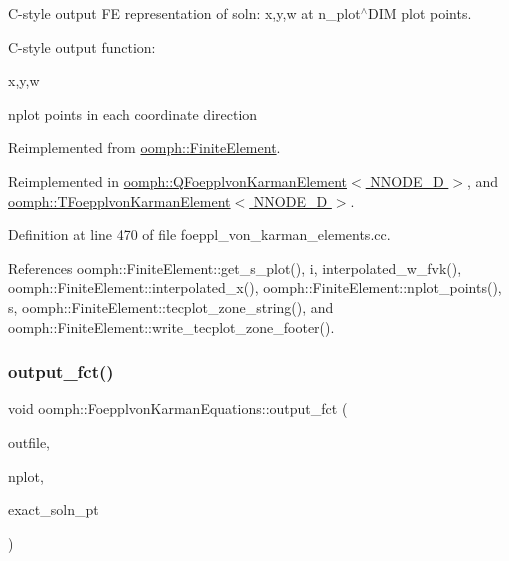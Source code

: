 C-\/style output FE representation of soln\+: x,y,w at n\+\_\+plot$^\wedge$\+D\+IM plot points. 

C-\/style output function\+:

x,y,w

nplot points in each coordinate direction 

Reimplemented from \hyperlink{classoomph_1_1FiniteElement_adfaee690bb0608f03320eeb9d110d48c}{oomph\+::\+Finite\+Element}.



Reimplemented in \hyperlink{classoomph_1_1QFoepplvonKarmanElement_a06a3e1ea84c4177bc32c819b5aa0f01e}{oomph\+::\+Q\+Foepplvon\+Karman\+Element$<$ N\+N\+O\+D\+E\+\_\+D $>$}, and \hyperlink{classoomph_1_1TFoepplvonKarmanElement_ac3899c4e4e2ae477e5e5afec72ae4730}{oomph\+::\+T\+Foepplvon\+Karman\+Element$<$ N\+N\+O\+D\+E\+\_\+D $>$}.



Definition at line 470 of file foeppl\+\_\+von\+\_\+karman\+\_\+elements.\+cc.



References oomph\+::\+Finite\+Element\+::get\+\_\+s\+\_\+plot(), i, interpolated\+\_\+w\+\_\+fvk(), oomph\+::\+Finite\+Element\+::interpolated\+\_\+x(), oomph\+::\+Finite\+Element\+::nplot\+\_\+points(), s, oomph\+::\+Finite\+Element\+::tecplot\+\_\+zone\+\_\+string(), and oomph\+::\+Finite\+Element\+::write\+\_\+tecplot\+\_\+zone\+\_\+footer().

\mbox{\label{classoomph_1_1FoepplvonKarmanEquations_a2e926381021b99050cebb69a07867ebc}} 
\subsubsection{\texorpdfstring{output\+\_\+fct()}{output\_fct()}\hspace{0.1cm}{\footnotesize\ttfamily [1/2]}}
{\footnotesize\ttfamily void oomph\+::\+Foepplvon\+Karman\+Equations\+::output\+\_\+fct (\begin{DoxyParamCaption}\item[{std\+::ostream \&}]{outfile,  }\item[{const unsigned \&}]{nplot,  }\item[{\hyperlink{classoomph_1_1FiniteElement_a690fd33af26cc3e84f39bba6d5a85202}{Finite\+Element\+::\+Steady\+Exact\+Solution\+Fct\+Pt}}]{exact\+\_\+soln\+\_\+pt }\end{DoxyParamCaption})\hspace{0.3cm}{\ttfamily [virtual]}}



